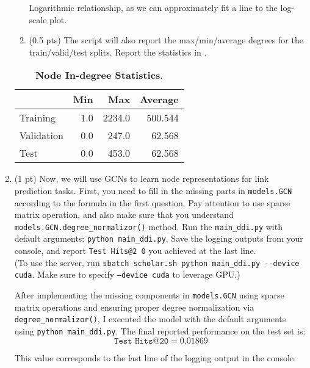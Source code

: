 \begin{enumerate}
\begin{enumerate}
        Logarithmic relationship, as we can approximately fit a line to the
        log-scale plot.

        \item (0.5 pts) The script will also report the max/min/average degrees for the train/valid/test splits. Report the statistics in .
    \end{enumerate}
%

\begin{table}[h!]
\caption{\textbf{Node In-degree Statistics}.}
\label{tab:indeg}
\begin{center}
\centering
\begin{tabular}{l|rrr}
    \hline
    & Min & Max & Average
    \\
    \hline
    Training & 1.0 & 2234.0 & 500.544
    \\
    \hline
    Validation & 0.0 & 247.0 & 62.568
    \\
    \hline
    Test & 0.0 & 453.0 & 62.568
    \\
    \hline
\end{tabular}
\end{center}
\end{table}


%
\item
    (1 pt)
    Now, we will use GCNs to learn node representations for link prediction
    tasks.
    First, you need to fill in the missing parts in \texttt{models.GCN}
    according to the formula in the first question.
    Pay attention to use sparse matrix operation, and also make sure that you understand \texttt{models.GCN.degree\_normalizor()} method.
    Run the \texttt{main\_ddi.py} with default arguments: \verb|python main_ddi.py|.
    Save the logging outputs from your console, and report \texttt{Test Hits@2%
    0} you achieved at the last line. \\(To use the server, run \verb|sbatch scholar.sh python main_ddi.py --device cuda|. Make sure to specify \texttt{--device cuda} to leverage GPU.)

    After implementing the missing components in \texttt{models.GCN} using
    sparse matrix operations and ensuring proper degree normalization via
    \texttt{degree\_normalizor()}, I executed the model with the default
    arguments using \texttt{python main\_ddi.py}. The final reported performance
    on the test set is:
    \[
    \texttt{Test Hits@20} = 0.01869
    \]

This value corresponds to the last line of the logging output in the console.



\end{enumerate}
